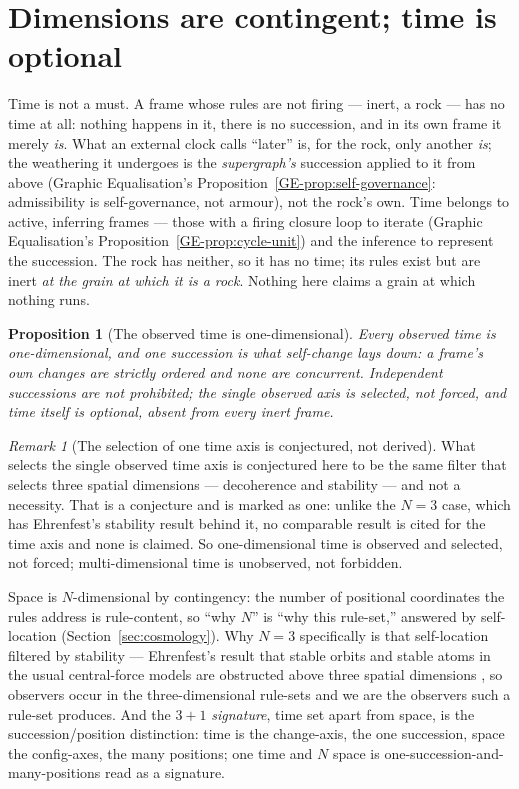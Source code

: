 \documentclass[11pt,a4paper]{article}
\newtheorem{proposition}[definition]{Proposition}
\theoremstyle{remark}\newtheorem{remark}[definition]{Remark}
\begin{document}
\section{Dimensions are contingent; time is optional}\label{sec:dimensions}
Time is not a must. A frame whose rules are not firing --- inert, a rock --- has
no time at all: nothing happens in it, there is no succession, and in its own
frame it merely \emph{is}. What an external clock calls ``later'' is, for the
rock, only another \emph{is}; the weathering it undergoes is the \emph{supergraph's}
succession applied to it from above (Graphic Equalisation's
Proposition~\ref{GE-prop:self-governance}: admissibility is self-governance, not armour), not the
rock's own. Time belongs to active, inferring frames --- those
with a firing closure loop to iterate (Graphic Equalisation's Proposition~\ref{GE-prop:cycle-unit})
and the
inference to represent the succession. The rock has neither, so it has no time;
its rules exist but are inert \emph{at the grain at which it is a rock}. Nothing
here claims a grain at which nothing runs.

\begin{proposition}[The observed time is one-dimensional]\label{prop:one-time}
Every observed time is one-dimensional, and one succession is what self-change
lays down: a frame's own changes are strictly ordered and none are concurrent.
Independent successions are not prohibited; the single observed axis is selected,
not forced, and time itself is optional, absent from every inert frame.
\end{proposition}

\begin{remark}[The selection of one time axis is conjectured, not derived]\label{rem:one-time-conjecture}
What selects the single observed time axis is conjectured here to be the same
filter that selects three spatial dimensions --- decoherence and stability ---
and not a necessity. That is a conjecture and is marked as one: unlike the $N=3$
case, which has Ehrenfest's stability result behind it, no comparable result is
cited for the time axis and none is claimed. So one-dimensional time is observed
and selected, not forced; multi-dimensional time is unobserved, not forbidden.
\end{remark}

Space is $N$-dimensional by contingency: the number of positional coordinates the
rules address is rule-content, so ``why $N$'' is ``why this rule-set,'' answered
by self-location (Section~\ref{sec:cosmology}). Why $N=3$ specifically is that
self-location filtered by stability --- Ehrenfest's result that stable orbits and
stable atoms in the usual central-force models are obstructed above three spatial dimensions \citep{ehrenfest1917}, so
observers occur in the three-dimensional rule-sets and we are the observers such a
rule-set produces. And the $3+1$ \emph{signature}, time set apart from space, is
the succession/position distinction: time is the change-axis, the one succession,
space the config-axes, the many positions; one time and $N$ space is
one-succession-and-many-positions read as a signature.
\end{document}
